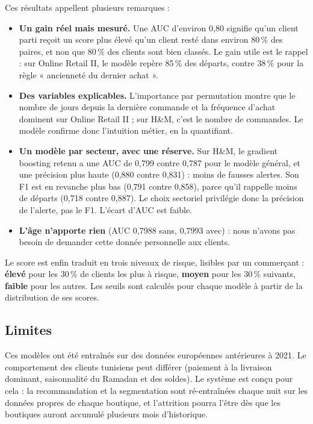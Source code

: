 Ces résultats appellent plusieurs remarques :
\begin{itemize}
  \item \textbf{Un gain réel mais mesuré.} Une AUC d'environ 0,80 signifie qu'un client parti reçoit un score plus élevé qu'un client resté dans environ 80\,\% des paires, et non que 80\,\% des clients sont bien classés. Le gain utile est le rappel : sur Online Retail II, le modèle repère 85\,\% des départs, contre 38\,\% pour la règle « ancienneté du dernier achat ».
  \item \textbf{Des variables explicables.} L'importance par permutation montre que le nombre de jours depuis la dernière commande et la fréquence d'achat dominent sur Online Retail II ; sur H\&M, c'est le nombre de commandes. Le modèle confirme donc l'intuition métier, en la quantifiant.
  \item \textbf{Un modèle par secteur, avec une réserve.} Sur H\&M, le gradient boosting retenu a une AUC de 0,799 contre 0,787 pour le modèle général, et une précision plus haute (0,880 contre 0,831) : moins de fausses alertes. Son F1 est en revanche plus bas (0,791 contre 0,858), parce qu'il rappelle moins de départs (0,718 contre 0,887). Le choix sectoriel privilégie donc la précision de l'alerte, pas le F1. L'écart d'AUC est faible.
  \item \textbf{L'âge n'apporte rien} (AUC 0,7988 sans, 0,7993 avec) : nous n'avons pas besoin de demander cette donnée personnelle aux clients.
\end{itemize}
Le score est enfin traduit en trois niveaux de risque, lisibles par un commerçant : \textbf{élevé} pour les 30\,\% de clients les plus à risque, \textbf{moyen} pour les 30\,\% suivants, \textbf{faible} pour les autres. Les seuils sont calculés pour chaque modèle à partir de la distribution de ses scores.

\subsection{Limites}
Ces modèles ont été entraînés sur des données européennes antérieures à 2021. Le comportement des clients tunisiens peut différer (paiement à la livraison dominant, saisonnalité du Ramadan et des soldes). Le système est conçu pour cela : la recommandation et la segmentation sont ré-entraînées chaque nuit sur les données propres de chaque boutique, et l'attrition pourra l'être dès que les boutiques auront accumulé plusieurs mois d'historique.

